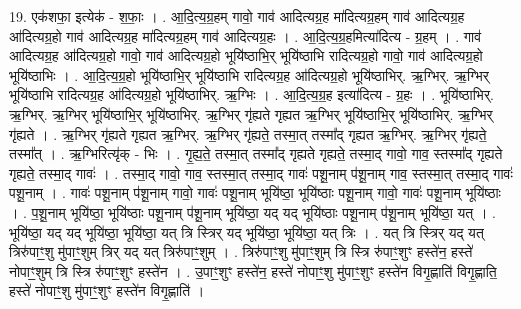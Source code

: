 \documentclass[17pt]{extarticle}
\begin{document}
19. एक॑शफा॒ इत्येक॑ - श॒फाः॒ । . आ॒दि॒त्य॒ग्र॒हम् गावो॒ गाव॑ आदित्यग्र॒ह मा॑दित्यग्र॒हम् गाव॑ आदित्यग्र॒ह आ॑दित्यग्र॒हो गाव॑ आदित्यग्र॒ह मा॑दित्यग्र॒हम् गाव॑ आदित्यग्र॒हः । . आ॒दि॒त्य॒ग्र॒हमित्या॑दित्य - ग्र॒हम् । . गाव॑ आदित्यग्र॒ह आ॑दित्यग्र॒हो गावो॒ गाव॑ आदित्यग्र॒हो भूयि॑ष्ठाभि॒र् भूयि॑ष्ठाभि रादित्यग्र॒हो गावो॒ गाव॑ आदित्यग्र॒हो भूयि॑ष्ठाभिः । . आ॒दि॒त्य॒ग्र॒हो भूयि॑ष्ठाभि॒र् भूयि॑ष्ठाभि रादित्यग्र॒ह आ॑दित्यग्र॒हो भूयि॑ष्ठाभिर्. ऋ॒ग्भिर्. ऋ॒ग्भिर् भूयि॑ष्ठाभि रादित्यग्र॒ह आ॑दित्यग्र॒हो भूयि॑ष्ठाभिर्. ऋ॒ग्भिः । . आ॒दि॒त्य॒ग्र॒ह इत्या॑दित्य - ग्र॒हः । . भूयि॑ष्ठाभिर्. ऋ॒ग्भिर्. ऋ॒ग्भिर् भूयि॑ष्ठाभि॒र् भूयि॑ष्ठाभिर्. ऋ॒ग्भिर् गृ॑ह्यते गृह्यत ऋ॒ग्भिर् भूयि॑ष्ठाभि॒र् भूयि॑ष्ठाभिर्. ऋ॒ग्भिर् गृ॑ह्यते । . ऋ॒ग्भिर् गृ॑ह्यते गृह्यत ऋ॒ग्भिर्. ऋ॒ग्भिर् गृ॑ह्यते॒ तस्मा॒त् तस्मा᳚द् गृह्यत ऋ॒ग्भिर्. ऋ॒ग्भिर् गृ॑ह्यते॒ तस्मा᳚त् । . ऋ॒ग्भिरित्यृ॑क् - भिः । . गृ॒ह्य॒ते॒ तस्मा॒त् तस्मा᳚द् गृह्यते गृह्यते॒ तस्मा॒द् गावो॒ गाव॒ स्तस्मा᳚द् गृह्यते गृह्यते॒ तस्मा॒द् गावः॑ । . तस्मा॒द् गावो॒ गाव॒ स्तस्मा॒त् तस्मा॒द् गावः॑ पशू॒नाम् प॑शू॒नाम् गाव॒ स्तस्मा॒त् तस्मा॒द् गावः॑ पशू॒नाम् । . गावः॑ पशू॒नाम् प॑शू॒नाम् गावो॒ गावः॑ पशू॒नाम् भूयि॑ष्ठा॒ भूयि॑ष्ठाः पशू॒नाम् गावो॒ गावः॑ पशू॒नाम् भूयि॑ष्ठाः । . प॒शू॒नाम् भूयि॑ष्ठा॒ भूयि॑ष्ठाः पशू॒नाम् प॑शू॒नाम् भूयि॑ष्ठा॒ यद् यद् भूयि॑ष्ठाः पशू॒नाम् प॑शू॒नाम् भूयि॑ष्ठा॒ यत् । . भूयि॑ष्ठा॒ यद् यद् भूयि॑ष्ठा॒ भूयि॑ष्ठा॒ यत् त्रि स्त्रिर् यद् भूयि॑ष्ठा॒ भूयि॑ष्ठा॒ यत् त्रिः । . यत् त्रि स्त्रिर् यद् यत् त्रिरु॑पाꣳ॒॒शु मु॑पाꣳ॒॒शुम् त्रिर् यद् यत् त्रिरु॑पाꣳ॒॒शुम् । . त्रिरु॑पाꣳ॒॒शु मु॑पाꣳ॒॒शुम् त्रि स्त्रि रु॑पाꣳ॒॒शुꣳ हस्ते॑न॒ हस्ते॑ नोपाꣳ॒॒शुम् त्रि स्त्रि रु॑पाꣳ॒॒शुꣳ हस्ते॑न । . उ॒पाꣳ॒॒शुꣳ हस्ते॑न॒ हस्ते॑ नोपाꣳ॒॒शु मु॑पाꣳ॒॒शुꣳ हस्ते॑न विगृ॒ह्णाति॑ विगृ॒ह्णाति॒ हस्ते॑
नोपाꣳ॒॒शु मु॑पाꣳ॒॒शुꣳ हस्ते॑न विगृ॒ह्णाति॑ । \newline
\end{document}
